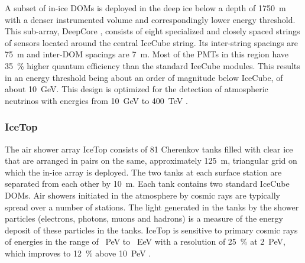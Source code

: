 A subset of in-ice DOMs is deployed in the deep ice below a
depth of \SI{1750}{\meter} with a denser instrumented volume and
correspondingly lower energy threshold. This
sub-array, DeepCore \cite{ICECUBE:DC}, consists of eight specialized and
closely spaced strings of sensors located around the central IceCube
string.  Its inter-string spacings are \SI{75}{\meter} and inter-DOM
spacings are \SI{7}{\meter}.  Most of the PMTs in this region have
\SI{35}{\%} higher quantum efficiency than the standard IceCube
modules.  This results in an energy threshold being about an order of
magnitude below IceCube, of about \SI{10}{\giga\electronvolt}. This design
is optimized for the detection of atmospheric neutrinos with energies
from \SI{10}{\giga\electronvolt} to \SI{400}{\tera\electronvolt}
\cite{ICECUBE:AtmNu}. 

\subsubsection{IceTop}

The air shower array IceTop \cite{ICECUBE:IceTop} consists of \num{81} Cherenkov tanks filled with clear ice that are arranged in pairs on the same, approximately \SI{125}{\meter}, triangular grid on which the in-ice array is deployed. The two tanks at each surface station are separated from each other by \SI{10}{\meter}. Each tank contains two standard IceCube DOMs. Air showers initiated in the atmosphere by cosmic rays are typically spread over a number of stations. The light generated in the tanks by the shower particles (electrons, photons, muons and hadrons) is a measure of the energy deposit of these particles in the tanks. IceTop is sensitive to primary cosmic rays of energies in the range of \SI{}{PeV} to \SI{}{EeV}  with a resolution of \SI{25}{\%} at \SI{2}{PeV}, which improves to \SI{12}{\%} above \SI{10}{PeV} \cite{IT:measurement}.




